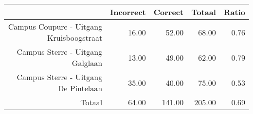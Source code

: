 \begin{tabular}{rrrrr}
  & Incorrect & Correct & Totaal & Ratio \\ 
  \midrule
Campus Coupure - Uitgang Kruisboogstraat & 16.00 & 52.00 & 68.00 & 0.76 \\ 
  Campus Sterre - Uitgang Galglaan & 13.00 & 49.00 & 62.00 & 0.79 \\ 
  Campus Sterre - Uitgang De Pintelaan & 35.00 & 40.00 & 75.00 & 0.53 \\ 
   \midrule
Totaal & 64.00 & 141.00 & 205.00 & 0.69 \\ 
  \end{tabular}
